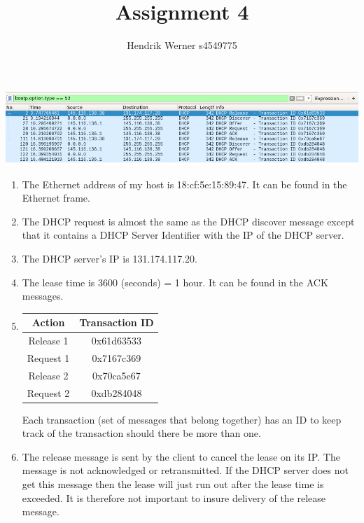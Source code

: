 \documentclass[12pt, a4paper]{article}
\title{Assignment 4}
\author{Hendrik Werner s4549775}
\begin{document}
\maketitle

\section{} %
\includegraphics[width=\linewidth]{screenshots/dhcp}

\begin{enumerate}[a]
	\item %
	The Ethernet address of my host is 18:cf:5e:15:89:47. It can be found in the Ethernet frame.

	\item %
	The DHCP request is almost the same as the DHCP discover message except that it contains a DHCP Server Identifier with the IP of the DHCP server.

	\item %
	The DHCP server's IP is 131.174.117.20.

	\item %
	The lease time is $3600$ (seconds) = 1 hour. It can be found in the ACK messages.

	\item %
	\begin{tabular}{|c|c|}
		\hline
		Action & Transaction ID\\\hline
		Release 1 & 0x61d63533\\\hline
		Request 1 & 0x7167c369\\\hline
		Release 2 & 0x70ca5e67\\\hline
		Request 2 & 0xdb284048\\\hline
	\end{tabular}

	Each transaction (set of messages that belong together) has an ID to keep track of the transaction should there be more than one.

	\item %
	The release message is sent by the client to cancel the lease on its IP. The message is not acknowledged or retransmitted. If the DHCP server does not get this message then the lease will just run out after the lease time is exceeded. It is therefore not important to insure delivery of the release message.
\end{enumerate}
\end{document}
